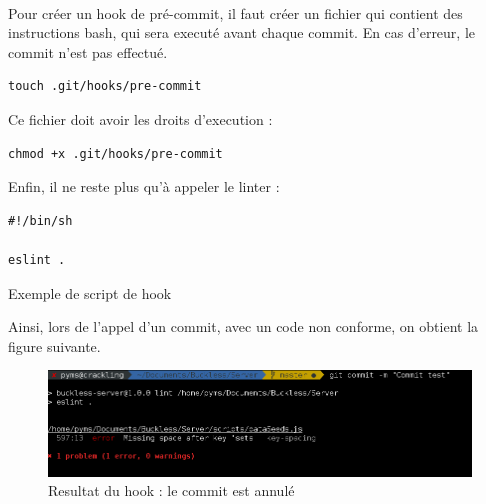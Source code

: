         \paragraph{}
            Pour créer un hook de pré-commit, il faut créer un fichier qui contient des instructions bash,
            qui sera executé avant chaque commit. En cas d'erreur, le commit n'est pas effectué.

            \begin{verbatim}
touch .git/hooks/pre-commit
            \end{verbatim}

            Ce fichier doit avoir les droits d'execution :

            \begin{verbatim}
chmod +x .git/hooks/pre-commit
            \end{verbatim}

            \newpage
            Enfin, il ne reste plus qu'à appeler le linter :

            \begin{listing}[h]
                \begin{verbatim}
#!/bin/sh

eslint .
                \end{verbatim}
                \caption{Exemple de script de hook}
            \end{listing}

            Ainsi, lors de l'appel d'un commit, avec un code non conforme, on obtient la figure suivante.

            \begin{figure}[ht]
                \centering
                \includegraphics[width=\textwidth]{./assets/hook.png}
                \caption{Resultat du hook : le commit est annulé}
            \end{figure}

